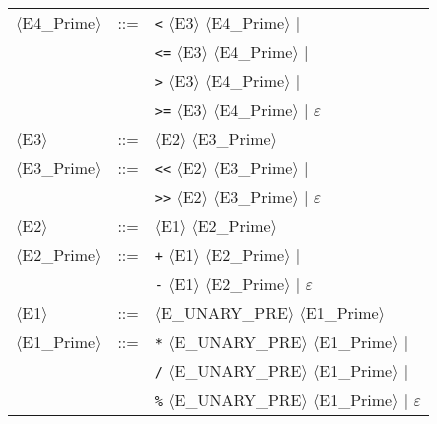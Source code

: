 \begin{footnotesize}
\begin{longtable}{>{\raggedright\arraybackslash}p{4cm}@{\ }>{\raggedright\arraybackslash}p{1.5cm}@{\ }>{\raggedright\arraybackslash}p{8.5cm}}
      $\langle$E4\_Prime$\rangle$ & ::= & \texttt{<} $\langle$E3$\rangle$ $\langle$E4\_Prime$\rangle$ $\mid$ \\
      & & \texttt{<=} $\langle$E3$\rangle$ $\langle$E4\_Prime$\rangle$ $\mid$ \\
      & & \texttt{>} $\langle$E3$\rangle$ $\langle$E4\_Prime$\rangle$ $\mid$ \\
      & & \texttt{>=} $\langle$E3$\rangle$ $\langle$E4\_Prime$\rangle$ $\mid$ $\varepsilon$ \\
      
      $\langle$E3$\rangle$ & ::= & $\langle$E2$\rangle$ $\langle$E3\_Prime$\rangle$ \\
      
      $\langle$E3\_Prime$\rangle$ & ::= & \texttt{<<} $\langle$E2$\rangle$ $\langle$E3\_Prime$\rangle$ $\mid$ \\
      & & \texttt{>>} $\langle$E2$\rangle$ $\langle$E3\_Prime$\rangle$ $\mid$ $\varepsilon$ \\
      
      $\langle$E2$\rangle$ & ::= & $\langle$E1$\rangle$ $\langle$E2\_Prime$\rangle$ \\
      
      $\langle$E2\_Prime$\rangle$ & ::= & \texttt{+} $\langle$E1$\rangle$ $\langle$E2\_Prime$\rangle$ $\mid$ \\
      & & \texttt{-} $\langle$E1$\rangle$ $\langle$E2\_Prime$\rangle$ $\mid$ $\varepsilon$ \\
      
      $\langle$E1$\rangle$ & ::= & $\langle$E\_UNARY\_PRE$\rangle$ $\langle$E1\_Prime$\rangle$ \\
      
      $\langle$E1\_Prime$\rangle$ & ::= & \texttt{*} $\langle$E\_UNARY\_PRE$\rangle$ $\langle$E1\_Prime$\rangle$ $\mid$ \\
      & & \texttt{/} $\langle$E\_UNARY\_PRE$\rangle$ $\langle$E1\_Prime$\rangle$ $\mid$ \\
      & & \texttt{\%} $\langle$E\_UNARY\_PRE$\rangle$ $\langle$E1\_Prime$\rangle$ $\mid$ $\varepsilon$ \\
      

\end{longtable}
\end{footnotesize}
